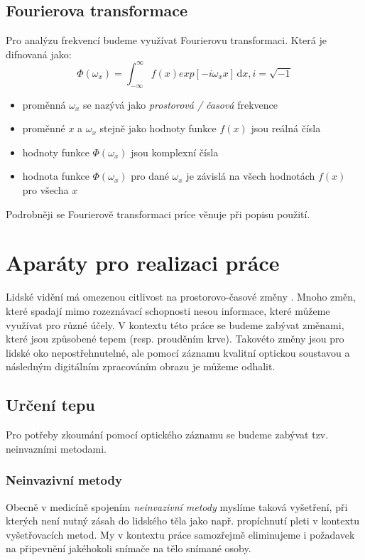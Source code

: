 \documentclass[
  digital, %
  table,   %
%
  lof,     %
  lot,     %
]{fithesis3}
\begin{document}
\section{Fourierova transformace}
    Pro analýzu frekvencí budeme využívat Fourierovu transformaci. Která je difnovaná jako:
    \begin{equation}
    \Phi(\omega_x)= \int_{-\infty}^{\infty} \! f(x)exp[-i\omega_xx]\, \mathrm{d}x, i =\sqrt{-1}
	\label{fourier-equation}
	\end{equation}

	\begin{itemize}
    	\item proměnná $\omega_x$ se nazývá jako \emph{prostorová / časová} frekvence \\
	    \item proměnné $x$ a $\omega_x$ stejně jako hodnoty funkce $f(x)$ jsou reálná čísla \\
		\item hodnoty funkce $\Phi(\omega_x)$ jsou komplexní čísla \\
	    \item hodnota funkce $\Phi(\omega_x)$ pro dané $\omega_x$ je závislá na všech hodnotách $f(x)$ pro všecha $x$\\
	\end{itemize}
    Podrobněji se Fourierově transformaci príce věnuje při popisu použití.


\chapter{Aparáty pro realizaci práce}
Lidské vidění má omezenou citlivost na prostorovo-časové změny \cite{eulerian-magnification}.
Mnoho změn, které spadají mimo rozeznávací schopnosti nesou informace, které můžeme využívat pro různé účely. V kontextu této práce se budeme zabývat změnami, které jsou způsobené tepem (resp. prouděním krve). Takovéto změny jsou pro lidské oko nepostřehnutelné, ale pomocí záznamu kvalitní optickou soustavou a následným digitálním zpracováním obrazu je můžeme odhalit.

\section{Určení tepu}
Pro potřeby zkoumání pomocí optického záznamu se budeme zabývat tzv. neinvazními metodami.

\subsection{Neinvazivní metody}
Obecně v medicíně spojením \emph{neinvazivní metody} myslíme taková vyšetření, při kterých není nutný zásah do lidského těla jako např. propíchnutí pleti v kontextu vyšetřovacích metod. My v kontextu práce samozřejmě eliminujeme i požadavek na připevnění jakéhokoli snímače na tělo snímané osoby.
\end{document}
